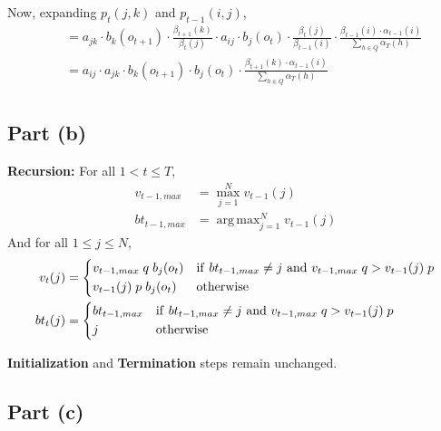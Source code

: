 \documentclass[11pt,a4paper,titlepage]{article}
\DeclareMathOperator*{\argmax}{arg\,max} %
\begin{document}
Now, expanding $p_t(j, k)$ and $p_{t-1}(i, j)$,
\begin{align*}
    ~~ &= a_{jk} \cdot b_k(o_{t+1}) \cdot \frac{\beta_{t+1}(k)}{\beta_t(j)} \cdot
          a_{ij} \cdot b_j(o_t) \cdot \frac{\beta_t(j)}{\beta_{t-1}(i)} \cdot
          \frac{\beta_{t-1}(i) \cdot \alpha_{t-1}(i)}{\sum_{h \in Q}\alpha_T(h)} \\
       &= a_{ij} \cdot a_{jk} \cdot b_k(o_{t+1}) \cdot b_j(o_t) \cdot
          \frac{\beta_{t+1}(k) \cdot \alpha_{t-1}(i)}{\sum_{h \in Q}\alpha_T(h)} \\
\end{align*}

\subsection*{Part (b)}

\textbf{Recursion:} For all $1 < t \le T$,
\begin{align*}
    v_{t-1, max} &= \max_{j=1}^N v_{t-1}(j) \\
    bt_{t-1, max} &= \argmax_{j=1}^N v_{t-1}(j) %
\end{align*}
And for all $1 \le j \le N$,
\begin{align*}
    v_t(j) &=
    \begin{dcases}
        v_{t-1, max} \; q \; b_j(o_t)
            & {\rm if~} bt_{t-1, max} \ne j {\rm~and~} v_{t-1, max} \; q > v_{t-1}(j) \; p \\
        v_{t-1}(j) \; p \; b_j(o_t)
            & \textrm{otherwise}
    \end{dcases} \\
    bt_t(j) &=
    \begin{dcases}
        bt_{t-1,max}
            & {\rm if~} bt_{t-1, max} \ne j {\rm~and~} v_{t-1, max} \; q > v_{t-1}(j) \; p \\
        j
            & \textrm{otherwise}
    \end{dcases}
\end{align*}

\noindent \textbf{Initialization} and \textbf{Termination} steps remain unchanged.

\subsection*{Part (c)}
\end{document}
